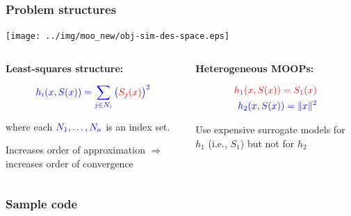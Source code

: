 \documentclass[aspectratio=169]{beamer}
\begin{document}
\begin{frame}\frametitle{Problem structures}
\begin{center}
\texttt{[image: ../img/moo\_new/obj-sim-des-space.eps]}
\end{center}
\begin{columns}
\begin{column}{0.5\textwidth}
\textbf{Least-squares structure:}

\medskip

{\large
$$
{\color{blue} h_i(x, S(x)) = \sum_{j \in N_i} \big({\color{red}S_j(x)}\big)^2}
$$

where each ${\color{blue} N_1, \ldots, N_o}$ is an index set.
}

\bigskip

Increases order of approximation $\Rightarrow$
increases order of convergence

\end{column}
\begin{column}{0.5\textwidth}
\textbf{Heterogeneous MOOPs:}

{\large
\begin{align*}
{\color{red} h_1(x, S(x)) = S_1(x)}\\
{\color{blue} h_2(x, S(x)) = \|x \|^2}
\end{align*}
}

Use expensive surrogate models for {\color{red} $h_1$} (i.e.,
{\color{red} $S_1$}) but not for {\color{blue} $h_2$}

\end{column}
\end{columns}
\end{frame}

\begin{frame}[fragile]\frametitle{Sample code}
  \lstset{style=python}
  
\end{frame}
\end{document}
